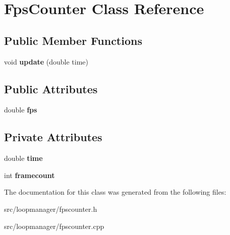 \hypertarget{class_fps_counter}{}\section{Fps\+Counter Class Reference}
\label{class_fps_counter}
\subsection*{Public Member Functions}
\begin{DoxyCompactItemize}
\item 
\hypertarget{class_fps_counter_a660c927cb2bc75cf6a5d09c05225d616}{}void {\bfseries update} (double time)\label{class_fps_counter_a660c927cb2bc75cf6a5d09c05225d616}

\end{DoxyCompactItemize}
\subsection*{Public Attributes}
\begin{DoxyCompactItemize}
\item 
\hypertarget{class_fps_counter_a71e5c3aaa95be7e76ef64f4847fb176c}{}double {\bfseries fps}\label{class_fps_counter_a71e5c3aaa95be7e76ef64f4847fb176c}

\end{DoxyCompactItemize}
\subsection*{Private Attributes}
\begin{DoxyCompactItemize}
\item 
\hypertarget{class_fps_counter_a9708f4cc1dc8a28891872b4281f8cb31}{}double {\bfseries time}\label{class_fps_counter_a9708f4cc1dc8a28891872b4281f8cb31}

\item 
\hypertarget{class_fps_counter_ae938f0a21d2ccf24ceb3396947b416f4}{}int {\bfseries framecount}\label{class_fps_counter_ae938f0a21d2ccf24ceb3396947b416f4}

\end{DoxyCompactItemize}


The documentation for this class was generated from the following files\+:\begin{DoxyCompactItemize}
\item 
src/loopmanager/fpscounter.\+h\item 
src/loopmanager/fpscounter.\+cpp\end{DoxyCompactItemize}
